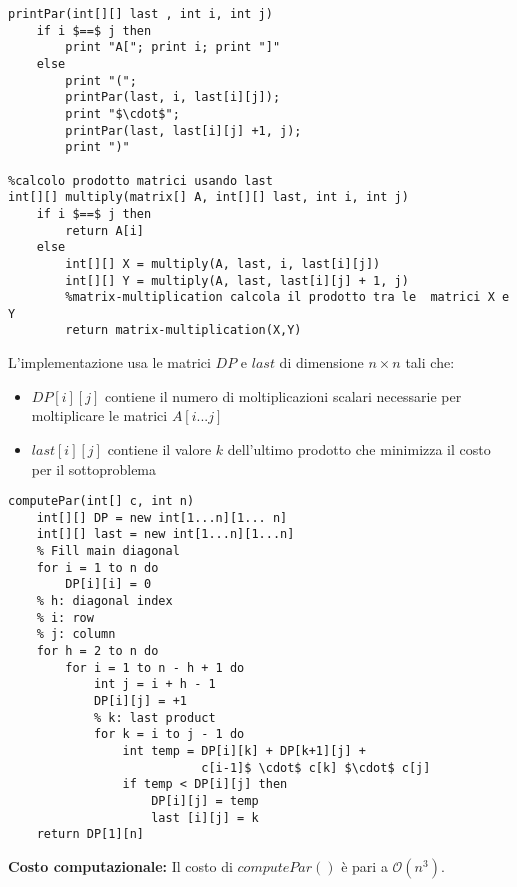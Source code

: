 \documentclass[../cheatSheetAlgoritmi.tex]{subfiles}
\begin{document}
\newpage
\begin{lstlisting}[caption= Calcolo prodotto di matrici e stampa parentesizzazione ottima usando matrice last]
%ricostruzione della soluzione (stampa prodotto)
printPar(int[][] last , int i, int j)
	if i $==$ j then
		print "A["; print i; print "]"
	else
		print "(";
		printPar(last, i, last[i][j]);
		print "$\cdot$";
		printPar(last, last[i][j] +1, j);
		print ")"

%calcolo prodotto matrici usando last 
int[][] multiply(matrix[] A, int[][] last, int i, int j)
	if i $==$ j then
		return A[i]
	else
		int[][] X = multiply(A, last, i, last[i][j])
		int[][] Y = multiply(A, last, last[i][j] + 1, j)
		%matrix-multiplication calcola il prodotto tra le  matrici X e Y
		return matrix-multiplication(X,Y)
\end{lstlisting}
\noindent
L'implementazione usa le matrici $DP$ e $last$ di dimensione $n \times n$ tali che:
\begin{itemize}
	\item $DP[i][j]$ contiene il numero di moltiplicazioni scalari necessarie per moltiplicare le matrici $A[i...j]$ 
	\item $last [i][j]$ contiene il valore $k$ dell'ultimo prodotto che minimizza il costo per il sottoproblema
\end{itemize}
\begin{lstlisting}[caption= Calcolo parentesizzazione ottima]
%calcolo della soluzione ottima
computePar(int[] c, int n)
	int[][] DP = new int[1...n][1... n]
	int[][] last = new int[1...n][1...n]
	% Fill main diagonal
	for i = 1 to n do 
		DP[i][i] = 0
	% h: diagonal index
	% i: row
	% j: column
	for h = 2 to n do
		for i = 1 to n - h + 1 do 
			int j = i + h - 1 
			DP[i][j] = +1
			% k: last product
			for k = i to j - 1 do 
				int temp = DP[i][k] + DP[k+1][j] + 
				           c[i-1]$ \cdot$ c[k] $\cdot$ c[j]
				if temp < DP[i][j] then
					DP[i][j] = temp
					last [i][j] = k
	return DP[1][n]
\end{lstlisting}
\textbf{Costo computazionale:} Il costo di $computePar()$ è pari a $\mathcal{O}(n^{3})$.
\newpage
\end{document}
